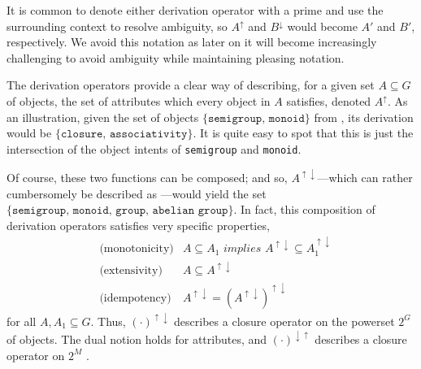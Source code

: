It is common to denote either derivation operator with a prime and use the surrounding context to resolve ambiguity, so $A^\uparrow$ and $B^\downarrow$ would become $A'$ and $B'$, respectively. We avoid this notation as later on it will become increasingly challenging to avoid ambiguity while maintaining pleasing notation. 

The derivation operators provide a clear way of describing, for a given set $A\subseteq G$ of objects, the set of attributes which every object in $A$ satisfies, denoted $A^\uparrow$. As an illustration, given the set of objects $\{\texttt{semigroup, monoid}\}$ from , its derivation would be $\{\texttt{closure, associativity}\}$. It is quite easy to spot that this is just the intersection of the object intents of \texttt{semigroup} and \texttt{monoid}.

Of course, these two functions can be composed; and so, $A^{\uparrow \downarrow}$---which can rather cumbersomely be described as ---would yield the set $\{\texttt{semigroup, monoid, group, abelian group}\}$. In fact, this composition of derivation operators satisfies very specific properties, 
\begin{align}
  & \text{(monotonicity)} & A \subseteq A_1 \textit{ implies } A^{\uparrow \downarrow} \subseteq A_1^{\uparrow \downarrow} \\
  & \text{(extensivity)}  & A \subseteq A^{\uparrow \downarrow} \\
  & \text{(idempotency)}  & A^{\uparrow \downarrow} = (A^{\uparrow \downarrow})^{\uparrow \downarrow}
\end{align}
for all $A, A_1 \subseteq G$. Thus, $(\cdot)^{\uparrow \downarrow}$ describes a closure operator on the powerset $2^G$ of objects. The dual notion holds for attributes, and $(\cdot)^{\downarrow \uparrow}$ describes a closure operator on $2^M$ \cite[pp. 18]{ganter1999formal}. 

